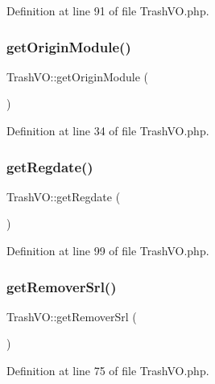 Definition at line 91 of file Trash\+V\+O.\+php.

\mbox{\label{classTrashVO_af893f99474e0d6ec8f537fdf1a67e4b4}} 
\subsubsection{\texorpdfstring{get\+Origin\+Module()}{getOriginModule()}}
{\footnotesize\ttfamily Trash\+V\+O\+::get\+Origin\+Module (\begin{DoxyParamCaption}{ }\end{DoxyParamCaption})}



Definition at line 34 of file Trash\+V\+O.\+php.

\mbox{\label{classTrashVO_ac7de0db59f33f9c3db7410cc54432c5b}} 
\subsubsection{\texorpdfstring{get\+Regdate()}{getRegdate()}}
{\footnotesize\ttfamily Trash\+V\+O\+::get\+Regdate (\begin{DoxyParamCaption}{ }\end{DoxyParamCaption})}



Definition at line 99 of file Trash\+V\+O.\+php.

\mbox{\label{classTrashVO_aefb79967cd30b4e805c889180f4c2329}} 
\subsubsection{\texorpdfstring{get\+Remover\+Srl()}{getRemoverSrl()}}
{\footnotesize\ttfamily Trash\+V\+O\+::get\+Remover\+Srl (\begin{DoxyParamCaption}{ }\end{DoxyParamCaption})}



Definition at line 75 of file Trash\+V\+O.\+php.

